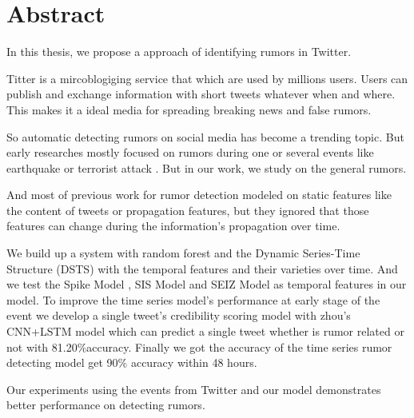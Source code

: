 
\chapter{Abstract}
 
In this thesis, we propose a approach of identifying rumors in Twitter. 

Titter is a mircoblogiging service that which are used by millions users. Users can publish and exchange information with short tweets whatever when and where. This makes it a ideal media for spreading breaking news and false rumors.  

So automatic detecting rumors on social media has become a trending topic. But early researches mostly focused on rumors during one or several events like earthquake or terrorist attack \cite{oh2010exploration} \cite{tanaka2012transmission}\cite{starbird2014rumors}. But in our work, we study on the general rumors.

And most of previous work for rumor detection modeled on static features like the content of tweets or propagation features, but they ignored that those features can change during the information's propagation over time.

We build up a system with random forest and the Dynamic Series-Time Structure (DSTS) \cite{ma2015detect} with the temporal features and their varieties over time. And we test the Spike Model \cite{kwon2013prominent}, SIS Model and SEIZ Model  \cite{jin2013epidemiological} as temporal features in our model. To improve the time series model's performance at early stage of the event we develop a single tweet's credibility scoring model with zhou's CNN+LSTM model \cite{zhou2015c} which can predict a single tweet whether is rumor related or not with 81.20\%accuracy. Finally we got the accuracy of the time series rumor detecting model get 90\% accuracy within 48 hours. 

 Our experiments using the events from Twitter and our model demonstrates better performance on detecting rumors.




